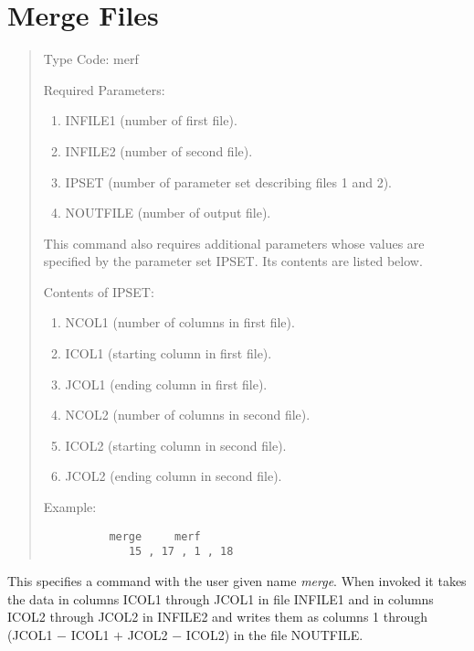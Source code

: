 \newpage
\section{Merge Files}  
\begin{quotation}
\noindent Type Code:  merf
\vspace{5mm}

\noindent Required Parameters:
\begin{enumerate}
\item INFILE1 (number of first file).

\item INFILE2 (number of second file).

\item IPSET (number of parameter set describing files 1 and 2).

\item NOUTFILE (number of output file).
\end{enumerate}
This command also requires additional parameters whose values are specified by the parameter set IPSET.  Its contents are listed below.

\noindent Contents of IPSET:
\begin{enumerate}
\item NCOL1 (number of columns in first file).

\item ICOL1 (starting column in first file).

\item JCOL1 (ending column in first file).

\item NCOL2 (number of columns in second file).

\item ICOL2 (starting column in second file).

\item JCOL2 (ending column in second file).
\end{enumerate}

\vspace{5mm}
\noindent Example:
\begin{verbatim}
          merge     merf
             15 , 17 , 1 , 18
\end{verbatim}
\end{quotation}
This specifies a command with the user given name {\em merge}.  When invoked it takes the data in columns ICOL1 through JCOL1 in file INFILE1 and in columns ICOL2 through JCOL2 in INFILE2 and writes them as columns 1 through (JCOL1 $-$ ICOL1 $+$ JCOL2 $-$ ICOL2) in the file NOUTFILE.

